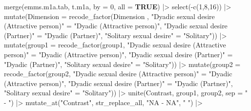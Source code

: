 \documentclass[
  bookmarksnumbered]{article}
\newenvironment{Shaded}{\begin{snugshade}}{\end{snugshade}}
\newcommand{\AttributeTok}[1]{\textcolor[rgb]{0.80,0.80,0.80}{#1}}
\newcommand{\ConstantTok}[1]{\textcolor[rgb]{0.86,0.64,0.64}{\textbf{#1}}}
\newcommand{\DecValTok}[1]{\textcolor[rgb]{0.86,0.86,0.80}{#1}}
\newcommand{\FunctionTok}[1]{\textcolor[rgb]{0.94,0.94,0.56}{#1}}
\newcommand{\NormalTok}[1]{\textcolor[rgb]{0.80,0.80,0.80}{#1}}
\newcommand{\OtherTok}[1]{\textcolor[rgb]{0.94,0.94,0.56}{#1}}
\newcommand{\SpecialCharTok}[1]{\textcolor[rgb]{0.86,0.64,0.64}{#1}}
\newcommand{\StringTok}[1]{\textcolor[rgb]{0.80,0.58,0.58}{#1}}
\begin{document}
\begin{Shaded}
\begin{Highlighting}[]
\FunctionTok{merge}\NormalTok{(emms.m1a.tab, t.m1a, }\AttributeTok{by =} \DecValTok{0}\NormalTok{, }\AttributeTok{all =} \ConstantTok{TRUE}\NormalTok{) }\SpecialCharTok{|\textgreater{}}
  \FunctionTok{select}\NormalTok{(}\SpecialCharTok{{-}}\FunctionTok{c}\NormalTok{(}\DecValTok{1}\NormalTok{,}\DecValTok{8}\NormalTok{,}\DecValTok{16}\NormalTok{)) }\SpecialCharTok{|\textgreater{}} 
  \FunctionTok{mutate}\NormalTok{(}\AttributeTok{Dimension =} \FunctionTok{recode\_factor}\NormalTok{(Dimension   ,}
                                \StringTok{"Dyadic sexual desire (Attractive person)"} \OtherTok{=} 
                                  \StringTok{"Dyadic (Attractive person)"}\NormalTok{,}
                                \StringTok{"Dyadic sexual desire (Partner)"} \OtherTok{=} 
                                  \StringTok{"Dyadic (Partner)"}\NormalTok{,}
                                \StringTok{"Solitary sexual desire"} \OtherTok{=} 
                                  \StringTok{"Solitary"}\NormalTok{)) }\SpecialCharTok{|\textgreater{}}
  \FunctionTok{mutate}\NormalTok{(}\AttributeTok{group1 =} \FunctionTok{recode\_factor}\NormalTok{(group1,}
                                \StringTok{"Dyadic sexual desire (Attractive person)"} \OtherTok{=} 
                                  \StringTok{"Dyadic (Attractive person)"}\NormalTok{,}
                                \StringTok{"Dyadic sexual desire (Partner)"} \OtherTok{=} 
                                  \StringTok{"Dyadic (Partner)"}\NormalTok{,}
                                \StringTok{"Solitary sexual desire"} \OtherTok{=} 
                                  \StringTok{"Solitary"}\NormalTok{)) }\SpecialCharTok{|\textgreater{}}
  \FunctionTok{mutate}\NormalTok{(}\AttributeTok{group2 =} \FunctionTok{recode\_factor}\NormalTok{(group2,}
                                \StringTok{"Dyadic sexual desire (Attractive person)"} \OtherTok{=} 
                                  \StringTok{"Dyadic (Attractive person)"}\NormalTok{,}
                                \StringTok{"Dyadic sexual desire (Partner)"} \OtherTok{=} 
                                  \StringTok{"Dyadic (Partner)"}\NormalTok{,}
                                \StringTok{"Solitary sexual desire"} \OtherTok{=} 
                                  \StringTok{"Solitary"}\NormalTok{)) }\SpecialCharTok{|\textgreater{}} 
  \FunctionTok{unite}\NormalTok{(Contrast, group1, group2, }\AttributeTok{sep =} \StringTok{" {-} "}\NormalTok{) }\SpecialCharTok{|\textgreater{}}
  \FunctionTok{mutate\_at}\NormalTok{(}\StringTok{"Contrast"}\NormalTok{, str\_replace\_all, }\StringTok{"NA {-} NA"}\NormalTok{, }\StringTok{" "}\NormalTok{) }\SpecialCharTok{|\textgreater{}} 

\end{Highlighting}
\end{Shaded}
\end{document}
